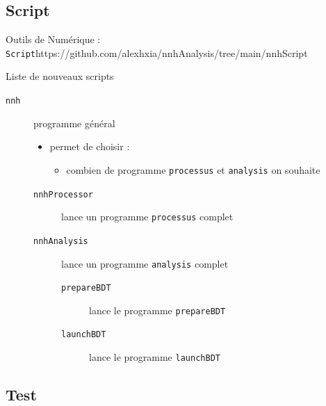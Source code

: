 \documentclass[9pt]{beamer}
\begin{document}

\subsection{Script}

\begin{frame}{Outils de Numérique : \texttt{Script}}{https://github.com/alexhxia/nnhAnalysis/tree/main/nnhScript}

\begin{block}{Liste de nouveaux scripts}
	\begin{description}
		\item[\texttt{nnh}] programme général 
		\begin{itemize}
			\item permet de choisir :
			\begin{itemize}
				\item combien de programme \texttt{processus} et \texttt{analysis} on souhaite
			\end{itemize}
		\end{itemize}
		\begin{description}
			\item[\texttt{nnhProcessor}] lance un programme \texttt{processus} complet
			\item[\texttt{nnhAnalysis}] lance un programme \texttt{analysis} complet
			\begin{description}
				\item[\texttt{prepareBDT}] lance le programme \texttt{prepareBDT}
				\item[\texttt{launchBDT}] lance le programme \texttt{launchBDT}
			\end{description}
		\end{description}
	\end{description}
\end{block}

\end{frame}

\subsection{Test}
\end{document}
